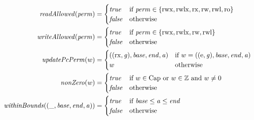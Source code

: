 \documentclass[a4paper]{article}
\newcommand{\false}{\mathit{false}}
\newcommand{\true}{\mathit{true}}
\newcommand{\var}[1]{\mathit{#1}}
\newcommand{\gl}{\var{g}}
\newcommand{\addr}{\var{a}}
\newcommand{\start}{\var{base}}
\newcommand{\addrend}{\var{end}}
\newcommand{\perm}{\var{perm}}
\newcommand{\plainfun}[2]{
  \ifthenelse{\equal{#2}{}}
  {\mathit{#1}}
  {\mathit{#1}(#2)}
}
\newcommand{\updatePcPerm}[1]{\plainfun{updatePcPerm}{#1}}
\newcommand{\executeAllowed}[1]{\plainfun{executeAllowed}{#1}}
\newcommand{\nonZero}[1]{\plainfun{nonZero}{#1}}
\newcommand{\readAllowed}[1]{\plainfun{readAllowed}{#1}}
\newcommand{\writeAllowed}[1]{\plainfun{writeAllowed}{#1}}
\newcommand{\withinBounds}[1]{\plainfun{withinBounds}{#1}}
\newcommand{\plaindom}[1]{\mathrm{#1}}
\newcommand{\Caps}{\plaindom{Cap}}
\newcommand{\ints}{\mathbb{Z}}
\newcommand{\plainperm}[1]{\mathrm{#1}}
\newcommand{\readonly}{\plainperm{ro}}
\newcommand{\readwrite}{\plainperm{rw}}
\newcommand{\exec}{\plainperm{rx}}
\newcommand{\entry}{\plainperm{e}}
\newcommand{\rwx}{\plainperm{rwx}}
\newcommand{\readwritel}{\plainperm{rwl}}
\newcommand{\rwlx}{\plainperm{rwlx}}
\begin{document}
\begin{align*}
  \readAllowed{\perm} &=
                        \begin{cases}
                          \true & \text{if } \perm \in \{ \rwx, \rwlx, \exec, \readwrite, \readwritel, \readonly \} \\
                          \false & \text{otherwise}
                        \end{cases} \\
  \writeAllowed{\perm} &=
                         \begin{cases}
                           \true &
                           \text{if } \perm \in \{ \rwx, \rwlx, \readwrite, \readwritel\} \\
                           \false & \text{otherwise}
                         \end{cases} \\
  \updatePcPerm{w} &=
                     \begin{cases}
                       ((\exec,\gl),\start,\addrend,\addr) & \text{if $w = ((\entry,\gl),\start,\addrend,\addr)$}\\
                       w & \text{otherwise} 
                     \end{cases} \\
  \nonZero{w} &=
                \begin{cases}
                  \true & \text{if $w\in \Caps$ or $w\in \ints$ and $w \neq 0$}\\
                  \false & \text{otherwise}
                \end{cases} \\
  \withinBounds{(\_,\start,\addrend,\addr)} &=
                                              \begin{cases}
                                                \true  & \text{if $\start \leq \addr \leq \addrend$} \\
                                                \false & \text{otherwise}
                                              \end{cases} \\

\end{align*}
\end{document}
